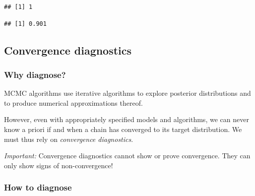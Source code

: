 \documentclass[
  11pt,
]{article}
\newenvironment{Shaded}{\begin{snugshade}}{\end{snugshade}}
\newcommand{\DecValTok}[1]{\textcolor[rgb]{0.00,0.00,0.81}{#1}}
\newcommand{\FloatTok}[1]{\textcolor[rgb]{0.00,0.00,0.81}{#1}}
\newcommand{\FunctionTok}[1]{\textcolor[rgb]{0.13,0.29,0.53}{\textbf{#1}}}
\newcommand{\NormalTok}[1]{#1}
\newcommand{\SpecialCharTok}[1]{\textcolor[rgb]{0.81,0.36,0.00}{\textbf{#1}}}
\begin{document}
\begin{Shaded}
\end{Shaded}

\begin{verbatim}
## [1] 1
\end{verbatim}

\begin{Shaded}
\end{Shaded}

\begin{verbatim}
## [1] 0.901
\end{verbatim}

\hypertarget{convergence-diagnostics}{%
\subsection{Convergence diagnostics}\label{convergence-diagnostics}}

\hypertarget{why-diagnose}{%
\subsubsection{Why diagnose?}\label{why-diagnose}}

MCMC algorithms use iterative algorithms to explore posterior
distributions and to produce numerical approximations thereof.

However, even with appropriately specified models and algorithms, we can
never know a priori if and when a chain has converged to its target
distribution. We must thus rely on \emph{convergence diagnostics}.

\emph{Important:} Convergence diagnostics cannot show or prove convergence.
They can only show signs of non-convergence!

\hypertarget{how-to-diagnose}{%
\subsubsection{How to diagnose}\label{how-to-diagnose}}
\end{document}
